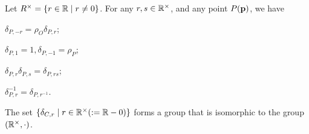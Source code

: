 \begin{lemma}
    Let \(R^\times = \{ r \in \mathbb{R} \mid r \neq 0\}\). For any \(r, s \in \mathbb{R}^\times\), and any point \(P(\mathbf{p})\), we have
    \begin{statements}{}
        \item \(\delta_{P, -r} = \rho_O \delta_{P, r}\);
        \item \(\delta_{P, 1} = 1, \delta_{P, -1} = \rho_P\);
        \item \(\delta_{P, r} \delta_{P, s} = \delta_{P, rs}\);
        \item \(\delta_{P ,r}^{-1} = \delta_{P, r^{-1}}\).
    \end{statements}
\end{lemma}

\begin{proposition}
    The set \(\{ \delta_{C, r} \mid r \in \mathbb{R}^\times(:= \mathbb{R} - 0)\}\) forms a group that is isomorphic to the group \((\mathbb{R}^\times, \cdot)\).
\end{proposition}